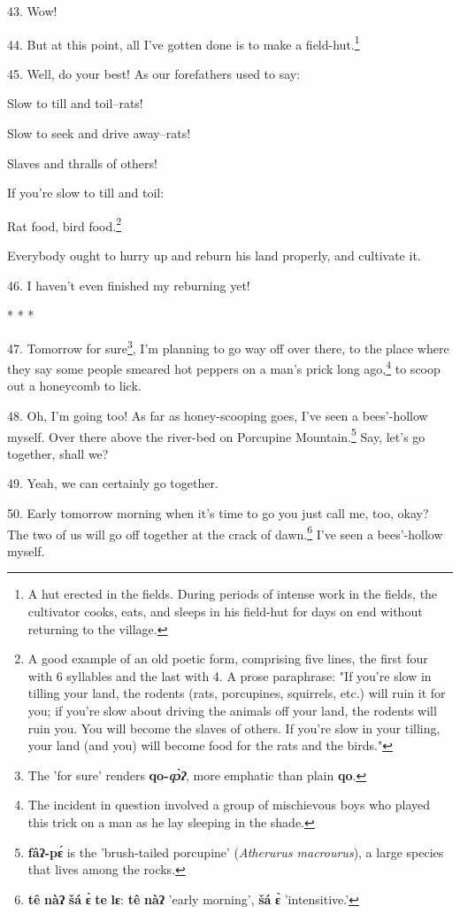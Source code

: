 43. Wow!

44. But at this point, all I've gotten done is to make a field-hut.\footnote{A hut erected in the fields. During periods of intense work in the fields, the cultivator cooks, eats, and sleeps in his field-hut for days on end without returning to the village.}

45. Well, do your best! As our forefathers used to say:

Slow to till and toil--rats!

Slow to seek and drive away--rats!

Slaves and thralls of others!

If you're slow to till and toil:

Rat food, bird food.\footnote{A good example of an old poetic form, comprising five lines, the first four with 6 syllables and the last with 4. A prose paraphrase: "If you're slow in tilling your land, the rodents (rats, porcupines, squirrels, etc.) will ruin it for you; if you're slow about driving the animals off your land, the rodents will ruin you. You will become the slaves of others. If you're slow in your tilling, your land (and you) will become food for the rats and the birds."}

Everybody ought to hurry up and reburn his land properly, and cultivate it.

46. I haven't even finished my reburning yet!

* * *

47. Tomorrow for sure\footnote{The 'for sure' renders \textbf{qo-\textit{\emph{qɔ̀ʔ}}}, more emphatic than plain \textbf{qo}.}, I'm planning to go way off over there, to the place
where they say some people smeared hot peppers on a man's prick long ago,\footnote{The incident in question involved a group of mischievous boys who played this trick on a man as he lay sleeping in the shade.} to
scoop out a honeycomb to lick.

48. Oh, I'm going too! As far as honey-scooping goes, I've seen a bees'-hollow
myself. Over there above the river-bed on Porcupine Mountain.\footnote{\textbf{fâʔ-pɛ́} is the 'brush-tailed porcupine' (\textit{Atherurus macrourus}), a large species that lives among the rocks.} Say, let's go
together, shall we?

49. Yeah, we can certainly go together.

50. Early tomorrow morning when it's time to go you just call me, too, okay? The
two of us will go off together at the crack of dawn.\footnote{\textbf{tê} \textbf{nàʔ} \textbf{šá} \textbf{ɛ̀} \textbf{te} \textbf{lɛ}: \textbf{tê} \textbf{nàʔ} 'early morning', \textbf{šá} \textbf{ɛ̀} 'intensitive.'} I've seen a bees'-hollow
myself.

